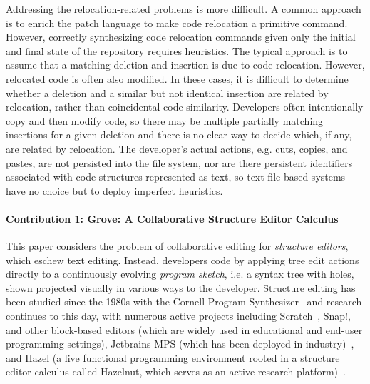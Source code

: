 Addressing the relocation-related problems is more difficult.
A common approach is to enrich the patch language to make code relocation a primitive command.
However, correctly synthesizing code relocation commands given only the initial and final state of the repository requires heuristics. 
The typical approach is to assume that a matching deletion and insertion is due to code relocation. However, relocated code is often also modified. 
In these cases, it is difficult to determine whether a deletion and a similar but not identical insertion are related by relocation, rather than coincidental code similarity. 
Developers often intentionally copy and then modify code, so there may be multiple partially matching insertions for a given deletion and there is no clear way to decide which, if any, are related by relocation. 
The developer's actual actions, e.g. cuts, copies, and pastes, are not persisted into the file system, nor are there persistent identifiers associated with code structures represented as text, so text-file-based systems have no choice but to deploy imperfect heuristics.

\paragraph{Contribution 1: Grove: A Collaborative Structure Editor Calculus} 
This paper considers the problem of collaborative editing for \emph{structure editors},
which eschew text editing. Instead, developers code by applying tree edit actions directly to a continuously evolving \emph{program sketch}, i.e. a syntax tree with holes, shown projected visually in various ways to the developer. 
Structure editing has been studied since the 1980s with the Cornell Program Synthesizer~\cite{DBLP:journals/cacm/TeitelbaumR81}
and research continues to this day, with numerous active projects including Scratch~\cite{maloney2010scratch}, Snap!, and other block-based editors (which are widely used in educational and end-user programming settings), Jetbrains MPS (which has been deployed in industry)~\cite{voelter2011language}, and Hazel (a live functional programming environment rooted in a structure editor calculus called Hazelnut, which serves as 
an active research platform)~\cite{DBLP:conf/popl/OmarVHAH17}. 

